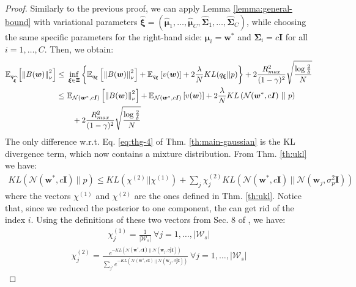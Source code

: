 \documentclass{article}
\newcommand{\wh}[1]{\widehat{#1}}
\newcommand{\norm}[1]{\left\lVert #1 \right\rVert}
\newcommand{\abs}[1]{\left\lvert #1 \right\rvert}
\begin{document}
\thmg*
\begin{proof}
Similarly to the previous proof, we can apply Lemma \ref{lemma:general-bound} with variational parameters $\wh{\bm{\xi}} = (\wh{\bm{\mu}}_1,\dots,\wh{\bm{\mu}}_C,\wh{\bm{\Sigma}}_1,\dots,\wh{\bm{\Sigma}}_C)$, while choosing the same specific parameters for the right-hand side: $\bm{\mu}_i = \bm{w}^*$ and $\bm{\Sigma}_i = c\bm{I}$ for all $i=1,\dots,C$. Then, we obtain:
\begin{align}\label{eq:thmg-1}
\mathbb{E}_{q_{\wh{\bm{\xi}}}}\left[ \norm{B(\bm{w})}_{\nu}^2 \right ] \leq\ & \inf_{\bm{\xi} \in \Xi}\left\{ \mathbb{E}_{q_{\bm{\xi}}}\left[ \norm{B(\bm{w})}_{\nu}^2 \right ] + \mathbb{E}_{q_{\bm{\xi}}}\left[ v(\bm{w}) \right] + 2\frac{\lambda}{N} KL({q_{\bm{\xi}}}||p) \right\} + 2\frac{R_{max}^2}{(1-\gamma)^2}\sqrt{\frac{\log\frac{2}{\delta}}{N}}\notag\\ \leq\ & \mathbb{E}_{\mathcal{N}(\bm{w}^*,c\bm{I})}\left[ \norm{B(\bm{w})}_{\nu}^2 \right ] + \mathbb{E}_{\mathcal{N}(\bm{w}^*,c\bm{I})}\left[ v(\bm{w}) \right] + 2\frac{\lambda}{N} KL\left(\mathcal{N}(\bm{w}^*,c\bm{I})\ ||\ p\right)\notag\\ &\ \ + 2\frac{R_{max}^2}{(1-\gamma)^2}\sqrt{\frac{\log\frac{2}{\delta}}{N}}
\end{align}
The only difference w.r.t. Eq. \eqref{eq:thg-4} of Thm. \ref{th:main-gaussian} is the KL divergence term, which now contains a mixture distribution. From Thm. \ref{th:ukl} we have:
\begin{align}\label{eq:thmg-2}
KL(\mathcal{N}(\bm{w}^*,c\bm{I})\ ||\ p) \leq KL(\chi^{(2)}||\chi^{(1)}) + \sum_{j} \chi^{(2)}_{j}KL(\mathcal{N}(\bm{w}^*,c\bm{I})\ ||\ \mathcal{N}(\bm{w}_j, \sigma_p^2\bm{I}))
\end{align}
where the vectors $\chi^{(1)}$ and $\chi^{(2)}$ are the ones defined in Thm. \ref{th:ukl}. Notice that, since we reduced the posterior to one component, the can get rid of the index $i$. Using the definitions of these two vectors from Sec. 8 of \cite{hershey2007approximating}, we have:
\begin{align*}
\chi^{(1)}_j = \frac{1}{\abs{\mathcal{W}_s}}\ \forall j = 1,\dots,\abs{\mathcal{W}_s}
\end{align*}
\begin{align}\label{eq:chi2}
\chi^{(2)}_j = \frac{e^{-KL(\mathcal{N}(\bm{w}^*,c\bm{I})\ ||\ \mathcal{N}(\bm{w}_j, \sigma_p^2\bm{I}))}}{\sum_{j'}e^{-KL(\mathcal{N}(\bm{w}^*,c\bm{I})\ ||\ \mathcal{N}(\bm{w}_{j'}, \sigma_p^2\bm{I}))}}\ \forall j = 1,\dots,\abs{\mathcal{W}_s}
\end{align}

\end{proof}
\end{document}
